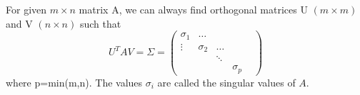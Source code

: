 For given \ensuremath{m \times n} matrix A, we can always find orthogonal matrices 
U \ensuremath{(m \times m)} and V \ensuremath{(n \times n)} such that \[ U^T A V = \Sigma 
= \left ( 
\begin{array}{ccccc} 
  \sigma_1 & \ldots & & & \\
  \vdots  & \sigma_2 & \ldots & & \\
  &  & \ddots & & \\
  & & & \sigma_p 
\end{array} 
\right ) 
\] where p=min(m,n).
The values $ \sigma_i $ are called the singular values of $A$.